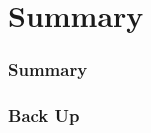 \documentclass{beamer}
\begin{document}
\section{Summary}
\begin{frame}
\frametitle{\Huge Summary}
\end{frame}


\begin{frame}

\frametitle{Back Up}
\end{frame}
\end{document}
